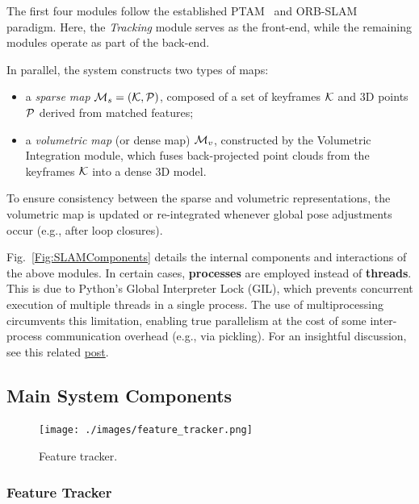 \documentclass{article}
\begin{document}
The first four modules follow the established PTAM~\cite{PTAM} and ORB-SLAM~\cite{ORB_SLAM2} paradigm. Here, the \textit{Tracking} module serves as the front-end, while the remaining modules operate as part of the back-end.

In parallel, the system constructs two types of maps:
\begin{itemize}
\item a \emph{sparse map} ${\cal M}_s = ({\cal K}, {\cal P})$, composed of a set of keyframes $\cal K$ and 3D points ${\cal P}$ derived from matched features;
\item a \emph{volumetric map} (or dense map) ${\cal M}_v$, constructed by the Volumetric Integration module, which fuses back-projected point clouds from the keyframes $\cal K$ into a dense 3D model.
\end{itemize}

To ensure consistency between the sparse and volumetric representations, the volumetric map is updated or re-integrated whenever global pose adjustments occur (e.g., after loop closures).

Fig.~\ref{Fig:SLAMComponents} details the internal components and interactions of the above modules. In certain cases, \textbf{processes} are employed instead of \textbf{threads}. This is due to Python's Global Interpreter Lock (GIL), which prevents concurrent execution of multiple threads in a single process. The use of multiprocessing circumvents this limitation, enabling true parallelism at the cost of some inter-process communication overhead (e.g., via pickling). For an insightful discussion, see this related \href{https://www.theserverside.com/blog/Coffee-Talk-Java-News-Stories-and-Opinions/Is-Pythons-GIL-the-software-worlds-biggest-blunder}{post}.



\subsection{Main System Components}

\begin{figure}[!h]
\begin{center}
    \texttt{[image: ./images/feature\_tracker.png]}
\end{center}
\caption{Feature tracker.}
\label{Fig:FeatureTracker}
\end{figure}

\subsubsection{Feature Tracker}
\end{document}

